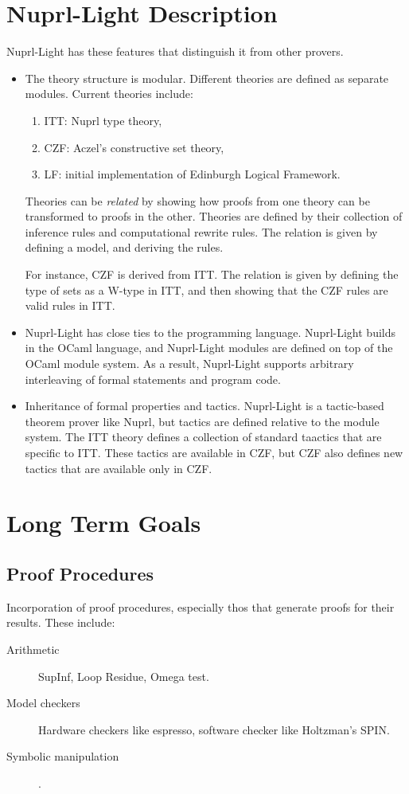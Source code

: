 \documentclass{article}
\begin{document}
\section{Nuprl-Light Description}

Nuprl-Light has these features that distinguish it from other provers.

\begin{itemize}
\item
The theory structure is modular.  Different theories are defined as
separate modules.  Current theories include:
\begin{enumerate}
\item
ITT: Nuprl type theory,
\item
CZF: Aczel's constructive set theory,
\item
LF: initial implementation of Edinburgh Logical Framework.
\end{enumerate}

Theories can be {\em related\/} by showing how proofs from one
theory can be transformed to proofs in the other.  Theories are
defined by their collection of inference rules and computational
rewrite rules.  The relation is given by defining a model, and
deriving the rules.

For instance, CZF is derived from ITT.  The relation is given by
defining the type of sets as a W-type in ITT, and then showing that
the CZF rules are valid rules in ITT.

\item
Nuprl-Light has close ties to the programming language.  Nuprl-Light
builds in the OCaml language, and Nuprl-Light modules are defined on
top of the OCaml module system.  As a result, Nuprl-Light supports
arbitrary interleaving of formal statements and program code.

\item
Inheritance of formal properties and tactics.  Nuprl-Light is a
tactic-based theorem prover like Nuprl, but tactics are defined
relative to the module system.  The ITT theory defines a collection of
standard taactics that are specific to ITT.  These tactics are
available in CZF, but CZF also defines new tactics that are available
only in CZF.
\end{itemize}

\section{Long Term Goals}

\subsection{Proof Procedures}
Incorporation of proof procedures, especially thos that generate
proofs for their results.  These include:
\begin{description}
\item[Arithmetic]
SupInf, Loop Residue, Omega test.
\item[Model checkers]
Hardware checkers like espresso,
software checker like Holtzman's SPIN.
\item[Symbolic manipulation].
\end{description}
\end{document}
